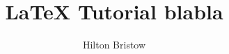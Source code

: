 \documentclass[11pt,a4paper]{book}
\begin{document}
\author{Hilton Bristow}
\title{\Large{\textbf{LaTeX Tutorial blabla}}}

\maketitle

\end{document}

